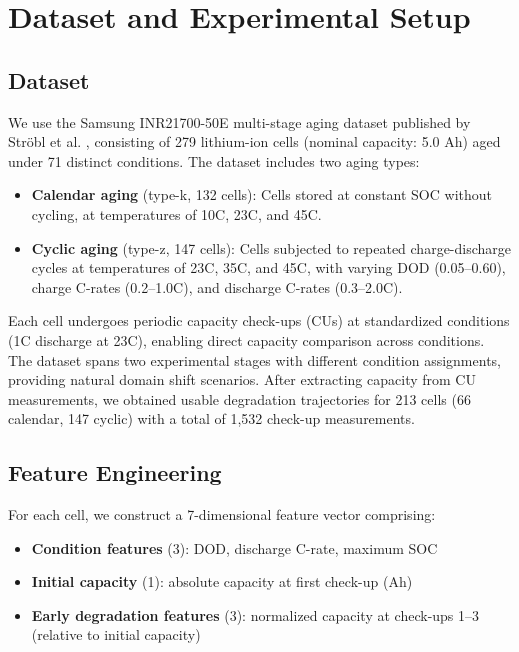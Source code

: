 \documentclass[review]{elsarticle}
\begin{document}
\section{Dataset and Experimental Setup}
\label{sec:setup}

\subsection{Dataset}

We use the Samsung INR21700-50E multi-stage aging dataset published by Str\"obl et al. \cite{stroebl2024multistage}, consisting of 279 lithium-ion cells (nominal capacity: 5.0 Ah) aged under 71 distinct conditions. The dataset includes two aging types:

\begin{itemize}
    \item \textbf{Calendar aging} (type-k, 132 cells): Cells stored at constant SOC without cycling, at temperatures of 10\textdegree C, 23\textdegree C, and 45\textdegree C.
    \item \textbf{Cyclic aging} (type-z, 147 cells): Cells subjected to repeated charge-discharge cycles at temperatures of 23\textdegree C, 35\textdegree C, and 45\textdegree C, with varying DOD (0.05--0.60), charge C-rates (0.2--1.0C), and discharge C-rates (0.3--2.0C).
\end{itemize}

Each cell undergoes periodic capacity check-ups (CUs) at standardized conditions (1C discharge at 23\textdegree C), enabling direct capacity comparison across conditions. The dataset spans two experimental stages with different condition assignments, providing natural domain shift scenarios. After extracting capacity from CU measurements, we obtained usable degradation trajectories for 213 cells (66 calendar, 147 cyclic) with a total of 1,532 check-up measurements.

\subsection{Feature Engineering}

For each cell, we construct a 7-dimensional feature vector comprising:
\begin{itemize}
    \item \textbf{Condition features} (3): DOD, discharge C-rate, maximum SOC
    \item \textbf{Initial capacity} (1): absolute capacity at first check-up (Ah)
    \item \textbf{Early degradation features} (3): normalized capacity at check-ups 1--3 (relative to initial capacity)
\end{itemize}
\end{document}
